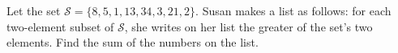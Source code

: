 Let the set $\mathcal{S} = \{8, 5, 1, 13, 34, 3, 21, 2\}$.  Susan makes a list as follows: for each two-element subset of $\mathcal{S}$, she writes on her list the greater of the set's two elements.  Find the sum of the numbers on the list.